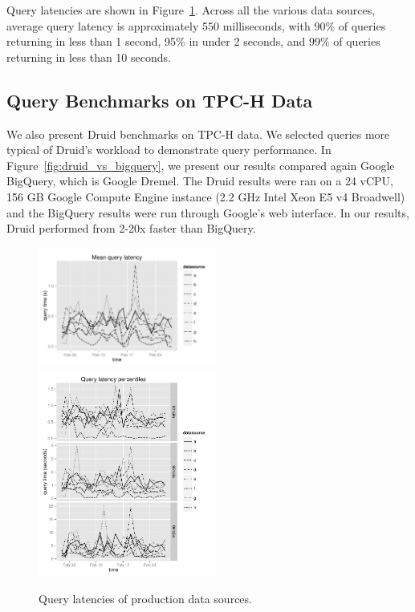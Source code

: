 \documentclass{vldb}
\begin{document}
Query latencies are shown in Figure~\ref{fig:query_latency}. Across all the various
data sources, average query latency is approximately 550 milliseconds, with
90\% of queries returning in less than 1 second, 95\% in under 2 seconds, and
99\% of queries returning in less than 10 seconds. 

\subsection{Query Benchmarks on TPC-H Data}
We also present Druid benchmarks on TPC-H data.  We selected queries more
typical of Druid's workload to demonstrate query performance. In
Figure~\ref{fig:druid_vs_bigquery}, we present our results compared again
Google BigQuery, which is Google Dremel\cite{melnik2010dremel}.  The Druid
results were ran on a 24 vCPU, 156 GB Google Compute Engine instance (2.2 GHz
Intel Xeon E5 v4 Broadwell) and the BigQuery results were run through Google's
web interface. In our results, Druid performed from 2-20x faster than BigQuery.

\begin{figure}
\centering
\includegraphics[width = 2.3in]{avg_query_latency}
\includegraphics[width = 2.3in]{query_percentiles}
\caption{Query latencies of production data sources.}
\label{fig:query_latency}
\end{figure}
\end{document}
